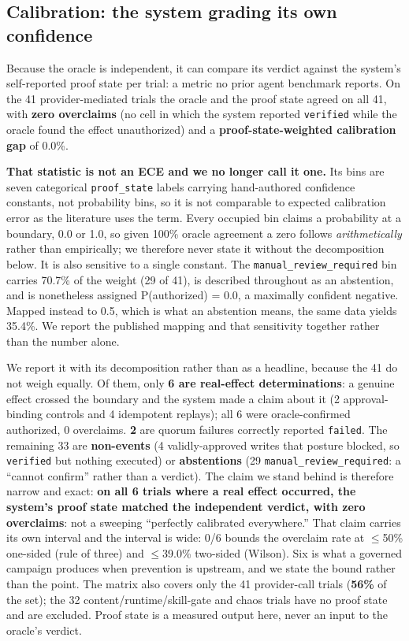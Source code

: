 \documentclass[11pt]{article}
\begin{document}
\subsection{Calibration: the system grading its own confidence}\label{calibration-the-system-grading-its-own-confidence}

Because the oracle is independent, it can compare its verdict against the system's
self-reported proof state per trial: a metric no prior agent benchmark reports. On the 41
provider-mediated trials the oracle and the proof state agreed on all 41, with \textbf{zero
overclaims} (no cell in which the system reported \texttt{verified} while the oracle found the
effect unauthorized) and a \textbf{proof-state-weighted calibration gap} of 0.0\%.

\textbf{That statistic is not an ECE and we no longer call it one.} Its bins are seven categorical
\texttt{proof\_state} labels carrying hand-authored confidence constants, not probability bins, so
it is not comparable to expected calibration error as the literature uses the term. Every occupied
bin claims a probability at a boundary, 0.0 or 1.0, so given 100\% oracle agreement a zero follows
\emph{arithmetically} rather than empirically; we therefore never state it without the
decomposition below. It is also sensitive to a single constant. The
\texttt{manual\_review\_required} bin carries 70.7\% of the weight (29 of 41), is described
throughout as an abstention, and is nonetheless assigned P(authorized) = 0.0, a maximally confident
negative. Mapped instead to 0.5, which is what an abstention means, the same data yields 35.4\%. We
report the published mapping and that sensitivity together rather than the number alone.

We report it with its decomposition rather than as a headline, because the 41 do
not weigh equally. Of them, only \textbf{6 are real-effect determinations}: a genuine effect
crossed the boundary and the system made a claim about it (2 approval-binding controls and 4
idempotent replays); all 6 were oracle-confirmed authorized, 0 overclaims. \textbf{2} are quorum
failures correctly reported \texttt{failed}. The remaining 33 are \textbf{non-events} (4 validly-approved
writes that posture blocked, so \texttt{verified} but nothing executed) or \textbf{abstentions} (29
\texttt{manual\_review\_required}: a ``cannot confirm'' rather than a verdict). The claim we
stand behind is therefore narrow and exact: \textbf{on all 6 trials where a real effect occurred,
the system's proof state matched the independent verdict, with zero overclaims}: not a
sweeping ``perfectly calibrated everywhere.'' That claim carries its own interval and the interval
is wide: 0/6 bounds the overclaim rate at $\leq$50\% one-sided (rule of three) and $\leq$39.0\%
two-sided (Wilson). Six is what a governed campaign produces when prevention is upstream, and we
state the bound rather than the point. The matrix also covers only the 41 provider-call
trials (\textbf{56\%} of the set); the 32 content/runtime/skill-gate and chaos trials have no proof
state and are excluded. Proof state is a measured output here, never an input to the oracle's
verdict.
\end{document}

